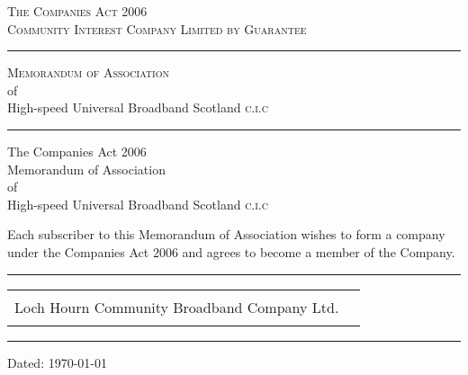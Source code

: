 \documentclass[tocflat]{article}
\newcommand{\companyname}{High-speed Universal Broadband Scotland
  \textsc{c.i.c}}%
\newenvironment{subscribers}{%
  \begin{longtable}{p{0.75\textwidth}p{0.25\textwidth}}%
}{%
  \end{longtable}%
}
\newcommand{\subscriber}[1]{#1 & %
  \begin{minipage}{0.25\textwidth}
    \hrule
  \end{minipage}\\%
}
\begin{document}
%

\thispagestyle{empty}%
\begin{center}%
  \textsc{The Companies Act 2006}\\
  \vspace{2em}%
  \textsc{Community Interest Company Limited by Guarantee}\\
  \vspace{8em}%
  \hrule
  \vspace{2em}%
  \textsc{Memorandum of Association}\\
  \vspace{1em}%
  of\\
  \vspace{1em}%
  \companyname\\
  \vspace{2em}%
  \hrule
\end{center}%
\newpage
\begin{center}%
  The Companies Act 2006\\
  Memorandum of Association\\
  of\\
  \companyname\\
\end{center}%
\vspace{2\baselineskip}%
\par\noindent 
Each subscriber to this Memorandum of Association wishes to form  a  company
under the Companies Act 2006 and agrees to become a member of the Company.
\par\vspace{2\baselineskip}
\hrule
\vspace{\baselineskip}
\begin{subscribers}
  \subscriber{Loch Hourn Community Broadband Company Ltd.}
\end{subscribers}
\vspace{\baselineskip}
\hrule
\par\vspace{\baselineskip}
\par\noindent
Dated: \today
\end{document}
